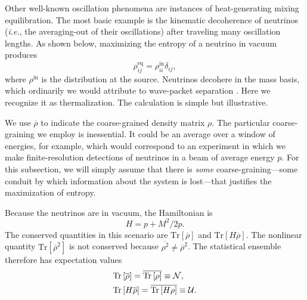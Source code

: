 \documentclass[aps,prd,twocolumn,groupedaddress,preprintnumbers]{revtex4-2}
\begin{document}
Other well-known oscillation phenomena are instances of heat-generating mixing equilibration. The most basic example is the kinematic decoherence of neutrinos (\textit{i.e.}, the averaging-out of their oscillations) after traveling many oscillation lengths. As shown below, maximizing the entropy of a neutrino in vacuum produces \begin{equation}
    \rho^\textrm{eq}_{ij} = \rho^\textrm{in}_{ii} \delta_{ij}, \label{eq:vacanswer}
\end{equation}
where $\rho^\textrm{in}$ is the distribution at the source. Neutrinos decohere in the mass basis, which ordinarily we would attribute to wave-packet separation \cite{akhmedov2009}. Here we recognize it as thermalization. The calculation is simple but illustrative.

We use $\overline{\rho}$ to indicate the coarse-grained density matrix $\rho$. The particular coarse-graining we employ is inessential. It could be an average over a window of energies, for example, which would correspond to an experiment in which we make finite-resolution detections of neutrinos in a beam of average energy $p$. For this subsection, we will simply assume that there is \textit{some} coarse-graining---some conduit by which information about the system is lost---that justifies the maximization of entropy.

Because the neutrinos are in vacuum, the Hamiltonian is
\begin{equation}
H = p + M^2 / 2p.
\end{equation}
The conserved quantities in this scenario are $\textrm{Tr}\left[ \overline{\rho} \right]$ and $\textrm{Tr}\left[ H \overline{\rho} \right]$. The nonlinear quantity $\textrm{Tr}[\overline{\rho}^2]$ is not conserved because $\overline{\rho^2} \neq \overline{\rho}^2$. The statistical ensemble therefore has expectation values
\begin{align}
&\textrm{Tr} \left[ \overline{\rho} \right] = \overline{\textrm{Tr}\left[ \rho \right]} \equiv \mathcal{N}, \notag \\
&\textrm{Tr}\left[ H \overline{\rho} \right] = \overline{\textrm{Tr}\left[ H \rho \right]} \equiv \mathcal{U}. \label{eq:vacconslaws}
\end{align}
\end{document}
